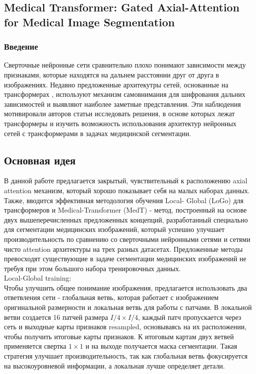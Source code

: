 \subsection*{Medical Transformer: Gated Axial-Attention for
Medical Image Segmentation}

\subsubsection*{Введение}
Сверточные нейронные сети сравнительно плохо понимают зависимости между признаками, которые находятся на дальнем расстоянии друг от друга
в изображениях. Недавно предложенные архитекутры сетей, основанные на
трансформерах \cite{Transformers}, используют механизм самовнимания \cite{SelfAttention} для шифрования дальних
зависимостей и выявляют наиболее заметные представления. Эти наблюдения
мотивировали авторов статьи исследовать решения, в основе которых лежат
трансформеры и изучить возможность использования архитектур нейронных
сетей с трансформерами в задачах медицинской сегментации. \cite{MedT} 

\subsection*{Основная идея}
В данной работе предлагается закрытый, чувствительный к расположению axial 
attention механизм, который хорошо показывает себя на малых
наборах данных. Также, вводится эффективная методология обучения Local-
Global (LoGo) для трансформеров и Medical-Transformer (MedT) - метод,
построенный на основе двух вышеперечисленных предложенных концепций,
разработанный специально для сегментации медицинских изображений, который успешно улучшает производительность по сравнению со сверточными
нейронными сетями и сетями чисто attention архитектуры на трех разных датасетах. Предложенные методы
превосходят существующие в задаче сегментации медицинских изображений
не требуя при этом большого набора тренировочных данных. \\


Local-Global training:\\

Чтобы улучшить общее понимание изображения, предлагается использовать 
два ответвления сети - глобальная ветвь, которая работает с 
изображением оригинальной размерности и локальная ветвь для работы с патчами. 
В локальной ветви создается 16 патчей размера \(I/4 \times I/4\), каждый патч 
пропускается через сеть и выходные карты признаков resampled, основываясь на их расположении, 
чтобы получить итоговые карты признаков. К итоговым картам двух ветвей применяется 
свертка \(1\times 1\) и на выходе получается маска сегментации. 
Такая стратегия улучшает производительность, так как глобальная ветвь 
фокусируется на высокоуровневой информации, а локальная лучше определяет детали.

